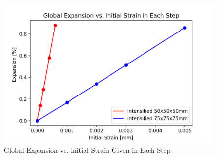 \begin{figure}[ht!]
\centering
\includegraphics[width=.8\linewidth]{Files/exp_plot/DEFA30X0vsX-5_exp.png}
  \caption{Global Expansion vs. Initial Strain Given in Each Step}
  \label{fig:DEFA30X0vzzsX-5_exp}
\end{figure}

